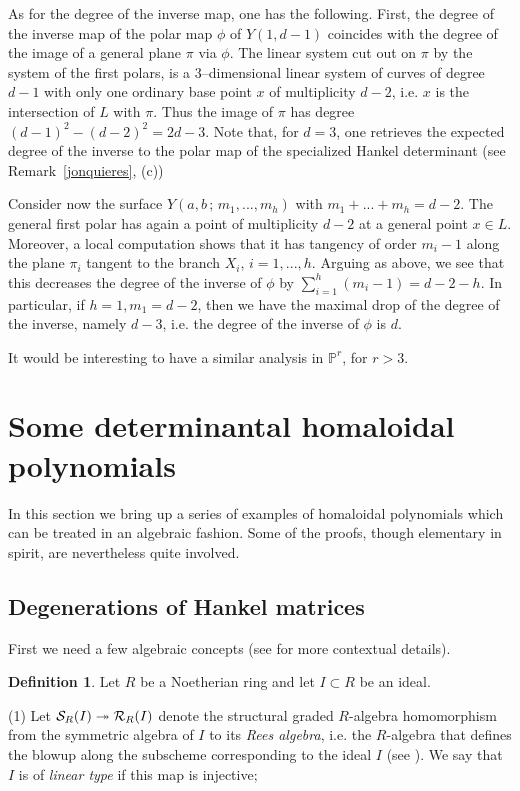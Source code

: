 \documentclass[11pt]{article}   %
\theoremstyle{definition}
\newtheorem{Definition}[Theorem]{Definition}
\numberwithin{Theorem}{section} \numberwithin{equation}{section}
\newcommand{\p}{{\mathbb P}}
\def\surjects{\twoheadrightarrow}
\begin{document}
{As for the degree of the inverse map, one has the following. First,
the degree of the inverse map of the polar map $\phi$ of $Y(1,d-1)$
coincides with the degree of the image of a general plane $\pi$ via
$\phi$. The linear system cut out on $\pi$ by the system of the
first polars, is a $3$--dimensional linear system of curves of
degree $d-1$ with only one ordinary base point $x$ of multiplicity
$d-2$, i.e. $x$ is the intersection of $L$ with $\pi$. Thus the
image of $\pi$ has degree $(d-1)^ 2-(d-2)^ 2=2d-3$. Note that, for
$d=3$, one retrieves the expected degree of the inverse to the polar
map of the specialized Hankel determinant (see
Remark~\ref{jonquieres}, (c))

Consider now the surface $Y(a,b\,;\,m_1,...,m_h)$ with
$m_1+...+m_h=d-2$. The general first polar has again a point of
multiplicity $d-2$ at a general point $x\in L$. Moreover, a local
computation shows that it has tangency of order $m_i-1$ along the
plane $\pi_i$ tangent to the branch $X_i$, $i=1,...,h$. Arguing as
above, we see that this decreases the degree of the inverse of
$\phi$ by $\sum_{i=1}^ h (m_i-1)=d-2-h$. In particular, if $h=1,
m_1=d-2$, then we have the maximal drop of the degree of the
inverse, namely $d-3$, i.e. the degree of the inverse of $\phi$ is
$d$.

It would be interesting to have a similar analysis in $\p^ r$, for
$r>3$.


\section{Some determinantal homaloidal polynomials}\label{algex}

In this section we bring up a series of
examples of homaloidal polynomials which can be treated in an
algebraic fashion. Some of the proofs, though elementary in spirit,
are nevertheless quite involved.

\subsection{Degenerations of Hankel matrices}\label{hankelmatrices}


 First we need a few algebraic concepts (see \cite{cremona}
for more contextual details).

\begin{Definition}\rm  Let $R$ be a Noetherian ring and  let $I\subset R$ be an
ideal.

(1) Let ${\cal S}_R(I)\surjects {\cal R}_R(I)$ denote the structural
graded $R$-algebra homomorphism from the symmetric algebra of $I$ to
its \emph {Rees algebra}, i.e. the $R$-algebra that defines the
blowup along the subscheme corresponding to the
 ideal $I$ (see \cite[{Section} 5.2]
{Eisenbook}). We say that $I$ is of {\it linear type\/} if this map
is injective{\rm ;}


\end{Definition}}
\end{document}
